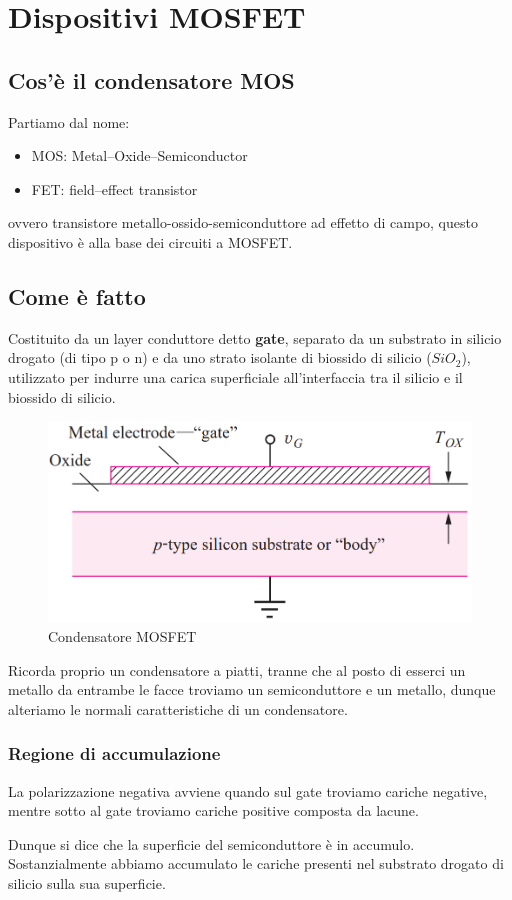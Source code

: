 \chapter{Dispositivi MOSFET}
\section{Cos'è il condensatore MOS}
Partiamo dal nome:
\begin{itemize}
    \item MOS: Metal–Oxide–Semiconductor
    \item FET: field–effect transistor
\end{itemize}
ovvero transistore metallo-ossido-semiconduttore ad effetto di campo, questo dispositivo è alla	base	dei	circuiti	a	MOSFET.

\section{Come è fatto}
Costituito	da	un	layer conduttore	detto	\textbf{gate},	separato	da	un	
substrato in	silicio	drogato	(di	tipo	p	o	n) e	da	uno	strato	isolante
di	biossido	di	silicio ($SiO_2$), utilizzato	per	indurre	una	carica	superficiale	all'interfaccia	tra	il	
silicio	e	il	biossido	di	silicio.

\begin{figure}[htbp]
    \centering
    \includegraphics[width=0.4\linewidth]{img/cond_mos.png}
    \caption{Condensatore MOSFET}    
\end{figure}

Ricorda proprio un condensatore a piatti, tranne che al posto di esserci un metallo da entrambe le facce troviamo un semiconduttore e un metallo, dunque alteriamo le normali caratteristiche di un condensatore.

\subsection{Regione	di	accumulazione}
La polarizzazione negativa avviene quando sul gate troviamo cariche negative, mentre sotto al gate troviamo cariche positive composta da lacune.

Dunque si dice che la superficie	del	semiconduttore	è	in	accumulo. Sostanzialmente abbiamo accumulato le cariche presenti nel substrato drogato di silicio sulla sua superficie.

